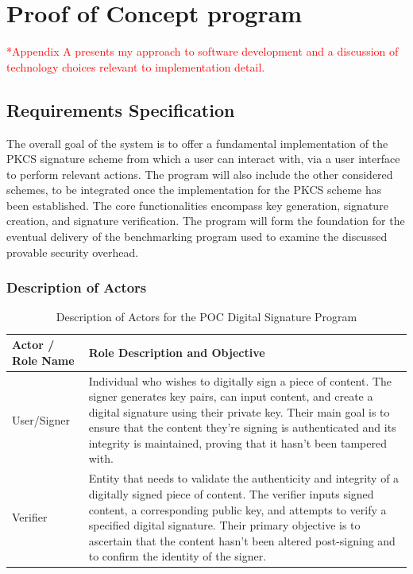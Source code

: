 \documentclass[]{final_report}
\theoremstyle{definition}
\begin{document}
\chapter{Proof of Concept program}

\textcolor{red}{*Appendix A presents my approach to software development and a discussion of technology choices relevant to implementation detail.}

\section{Requirements Specification}
The overall goal of the system is to offer a fundamental implementation of the PKCS signature scheme from which a user can interact with, via a user interface to perform relevant actions. The program will also include the other considered schemes, to be integrated once the implementation for the PKCS scheme has been established.
The core functionalities encompass key generation, signature creation, and signature verification.
The program will form the foundation for the eventual delivery of the benchmarking program used to examine the discussed provable security overhead.

\subsection{Description of Actors}
\begin{table}[H]
    \centering
    \caption{Description of Actors for the POC Digital Signature Program}
    \label{tab:actors_description}
    \begin{tabular}{|l|p{10cm}|}
    \hline
    \textbf{Actor / Role Name} & \textbf{Role Description and Objective} \\
    \hline
    User/Signer & Individual who wishes to digitally sign a piece of content. The signer generates key pairs, can input content, and create a digital signature using their private key. Their main goal is to ensure that the content they're signing is authenticated and its integrity is maintained, proving that it hasn't been tampered with. \\
    \hline
    Verifier & Entity that needs to validate the authenticity and integrity of a digitally signed piece of content. The verifier inputs signed content, a corresponding public key, and attempts to verify a specified digital signature. Their primary objective is to ascertain that the content hasn't been altered post-signing and to confirm the identity of the signer. \\
    \hline
    \end{tabular}
\end{table}
\end{document}
